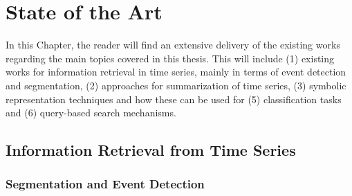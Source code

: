 
%

\chapter{State of the Art}
\label{cha:stateofart}

In this Chapter, the reader will find an extensive delivery of the existing works regarding the main topics covered in this thesis. This will include (1) existing works for information retrieval in time series, mainly in terms of event detection and segmentation, (2) approaches for summarization of time series, (3) symbolic representation techniques and how these can be used for (5) classification tasks and (6) query-based search mechanisms.

\section{Information Retrieval from Time Series} %
\label{sec:if_timeseries}

\subsection{Segmentation and Event Detection}

